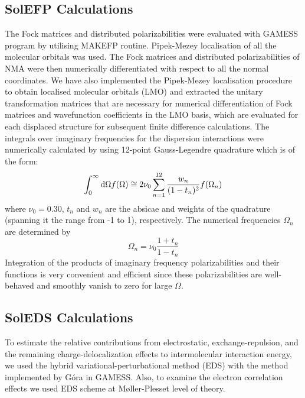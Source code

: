 \documentclass[a4paper,titlepage,twoside,fleqn,12pt]{book}
\begin{document}
\begin{appendices}
\begin{refsection}
\subsection{SolEFP Calculations}

The Fock matrices and distributed polarizabilities were
evaluated with GAMESS program by utilising MAKEFP routine. \citep{GAMESS.JCC.1993}
Pipek\hyp{}Mezey localisation \citep{Pipek.Mezey.JCP.1989}
of all the molecular orbitals was
used. The Fock matrices and distributed polarizabilities of
NMA were then numerically differentiated with respect to all
the normal coordinates. We have also implemented the Pipek\hyp{}Mezey 
localisation procedure to obtain localised molecular
orbitals (LMO) and extracted the unitary transformation matrices
that are necessary for numerical differentiation of Fock
matrices and wavefunction coefficients in the LMO basis,
which are evaluated for each displaced structure for subsequent
finite difference calculations. 
The integrals over
imaginary frequencies for the dispersion interactions were
numerically calculated by using 12\hyp{}point Gauss\hyp{}Legendre
quadrature which is of the form: \citep{Adamovic.Gordon.MolPhys.2005}
%
\begin{equation}
 \int_0^\infty {\rm d}\Omega f(\Omega) \cong 2\nu_0\sum_{n=1}^{12} \frac{w_n}{(1-t_n)^2}f(\Omega_n)
\end{equation}
%
where $\nu_0=0.30$, $t_n$ and $w_n$ are the
absicae and weights of the quadrature (spanning it the
range from -1 to 1), respectively. 
The numerical
frequencies $\Omega_n$ are determined by 
%
\begin{equation}
 \Omega_n = \nu_0 \frac{1+t_n}{1-t_n}
\end{equation}
% 
Integration of the products of imaginary frequency
polarizabilities and their functions is very convenient
and efficient since
these polarizabilities are well\hyp{}behaved and
smoothly vanish to zero for large $\Omega$.

\subsection{SolEDS Calculations}

To estimate the relative contributions from electrostatic,
exchange\hyp{}repulsion, and the remaining charge\hyp{}delocalization
effects to intermolecular interaction energy, we
used the hybrid variational\hyp{}perturbational method (EDS) \citep{Sokalski.Roszak.Pecul.CPL.1988,
Chalasinski.Szczesniak.MolPhys.1988,Cybulski.Chalasinski.Moszynski.JCP.1990,
Gora.Bartkowiak.Roszak.Leszczynski.JCP.2004} 
with the
method implemented by G{\'o}ra \citep{Gora.EDS.1998-2010} 
in GAMESS. \citep{GAMESS.JCC.1993} 
Also, to examine the electron correlation effects 
we used EDS scheme at M{\o}ller\hyp{}Plesset level of theory.


\end{refsection}
\end{appendices}
\end{document}

